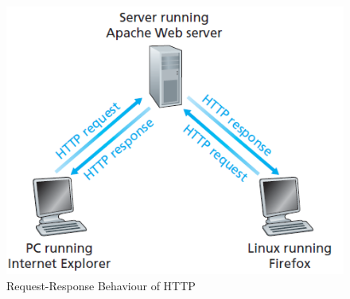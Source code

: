 \documentclass{article}
\theoremstyle{plain}
\theoremstyle{definition}
\begin{document}
\begin{figure}
    \centering
    \includegraphics[scale=0.6]{cn2.png}
    \caption{Request-Response Behaviour of HTTP}
    \label{fig:my_label_2}
\end{figure}
\end{document}
